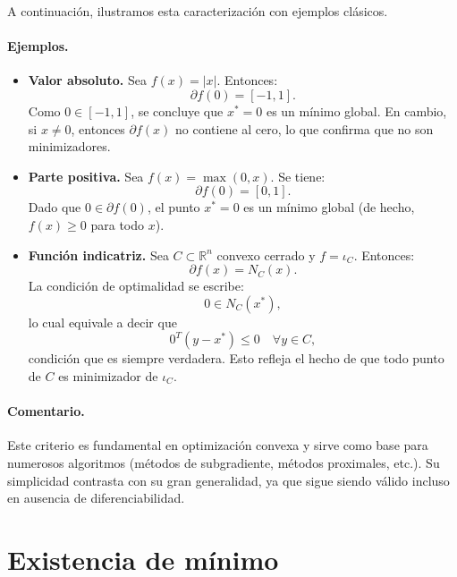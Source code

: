 \documentclass[12pt]{book}
\theoremstyle{definition}
\theoremstyle{plain}
\theoremstyle{remark}
\begin{document}
A continuación, ilustramos esta caracterización con ejemplos clásicos.

\paragraph{Ejemplos.}

\begin{itemize}
    \item \textbf{Valor absoluto.} Sea \( f(x) = |x| \). Entonces:
    \[
    \partial f(0) = [-1,1].
    \]
    Como \( 0 \in [-1,1] \), se concluye que \( x^* = 0 \) es un mínimo global. En cambio, si \( x \neq 0 \), entonces \( \partial f(x) \) no contiene al cero, lo que confirma que no son minimizadores.

    \item \textbf{Parte positiva.} Sea \( f(x) = \max(0,x) \). Se tiene:
    \[
    \partial f(0) = [0,1].
    \]
    Dado que \( 0 \in \partial f(0) \), el punto \( x^* = 0 \) es un mínimo global (de hecho, \( f(x) \geq 0 \) para todo \( x \)).

    \item \textbf{Función indicatriz.} Sea \( C \subset \mathbb{R}^n \) convexo cerrado y \( f = \iota_C \). Entonces:
    \[
    \partial f(x) = N_C(x).
    \]
    La condición de optimalidad se escribe:
    \[
    0 \in N_C(x^*),
    \]
    lo cual equivale a decir que
    \[
    0^T (y - x^*) \leq 0 \quad \forall y \in C,
    \]
    condición que es siempre verdadera. Esto refleja el hecho de que todo punto de \( C \) es minimizador de \( \iota_C \).
\end{itemize}

\paragraph{Comentario.}
Este criterio es fundamental en optimización convexa y sirve como base para numerosos algoritmos (métodos de subgradiente, métodos proximales, etc.). Su simplicidad contrasta con su gran generalidad, ya que sigue siendo válido incluso en ausencia de diferenciabilidad.


\section{Existencia de mínimo}
\end{document}
